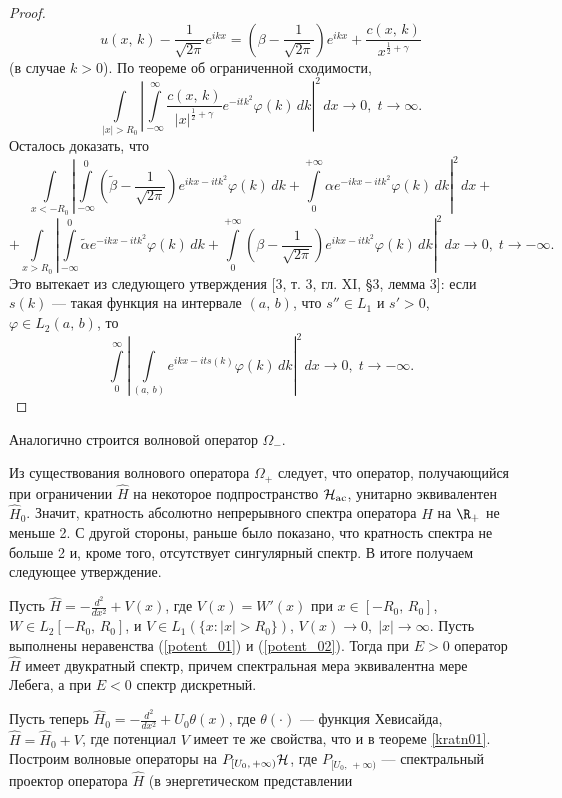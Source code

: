 \documentclass[a4paper
]{article}
\begin{document}
\begin{proof}
$$u(x, \, k)-\frac{1}{\sqrt{2\pi}}e^{ikx}=\left(\beta-\frac{1}{\sqrt{2\pi}}
\right) e^{ikx}+\frac{c(x, \, k)}{x^{\frac12+\gamma}}$$ (в случае $k>0$).
По теореме об ограниченной сходимости,
$$\int \limits_{|x|>R_0}\left|\int \limits_{-\infty}^\infty
\frac{c(x, \, k)}{|x|^{\frac12+\gamma}}e^{-itk^2}\varphi(k)\, dk\right|
^2\, dx\rightarrow 0, \; t\rightarrow \infty.$$
Осталось доказать, что $$\int \limits_{x<-R_0}\left|\int \limits_{-\infty}
^0 \left(\tilde \beta-\frac{1}{\sqrt{2\pi}}\right) e^{ikx-itk^2}
\varphi(k)\, dk+\int \limits_0^{+\infty}\alpha e^{-ikx-itk^2}\varphi(k)
\, dk\right|^2\, dx+$$
$$+\int \limits_{x>R_0}\left|\int \limits_{-\infty}^0 \tilde \alpha
e^{-ikx-itk^2}\varphi(k)\, dk+\int \limits_0^{+\infty}\left(\beta-\frac{1}
{\sqrt{2\pi}}\right)e^{ikx-itk^2}\varphi(k)\, dk\right|^2\, dx\rightarrow 0,
\; t\rightarrow -\infty.$$ Это вытекает из следующего утверждения
[3, т. 3, гл. XI, \S 3, лемма 3]: если $s(k)$ --- такая функция на
интервале $(a, \, b)$, что $s''\in L_1$ и $s'>0$, $\varphi\in L_2(a, \, b)$,
то $$\int \limits_0^\infty \left|\int \limits_{(a, \, b)}e^{ikx-its(k)}
\varphi(k)\, dk\right|^2\, dx\rightarrow 0, \; t\rightarrow -\infty.$$
\end{proof}
Аналогично строится волновой оператор $\Omega_-$. \par
Из существования волнового оператора $\Omega_+$ следует, что оператор,
получающийся при ограничении $\hat H$ на некоторое подпространство
${\cal H}_{{\rm ac}}$, унитарно эквивалентен $\hat H_0$. Значит, кратность
абсолютно непрерывного спектра оператора $\hat H$ на $\R_+$ не меньше 2.
С другой стороны, раньше было показано, что кратность спектра не больше 2
и, кроме того, отсутствует сингулярный спектр. В итоге получаем следующее
утверждение.
\begin{Trm}
\label{kratn01}
Пусть $\hat H=-\frac{d^2}{dx^2}+V(x)$, где $V(x)=W'(x)$ при $x\in [-R_0, \,
R_0]$, $W\in L_2[-R_0, \, R_0]$, и $V\in L_1(\{x:|x|>R_0\})$, $V(x)
\rightarrow 0, \; |x|\rightarrow \infty$. Пусть выполнены
неравенства (\ref{potent_01}) и (\ref{potent_02}). Тогда при $E>0$
оператор $\hat H$ имеет двукратный спектр, причем спектральная мера
эквивалентна мере Лебега, а при $E<0$ спектр дискретный.
\end{Trm}
Пусть теперь $\hat H_0=-\frac{d^2}{dx^2}+U_0\theta(x)$, где $\theta(\cdot)$
--- функция Хевисайда, $\hat H=\hat H_0+V$, где потенциал $V$ имеет те
же свойства, что и в теореме \ref{kratn01}. Построим волновые операторы
на $P_{[U_0, \, +\infty)}{\cal H}$, где $P_{[U_0, \, +\infty)}$ ---
спектральный проектор оператора $\hat H$ (в энергетическом представлении
\end{document}
